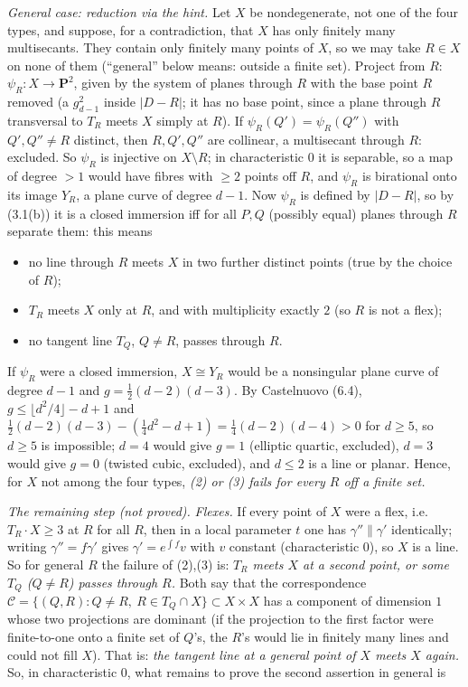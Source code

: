 \documentclass[11pt]{article}
\begin{document}
\emph{General case: reduction via the hint.} Let $X$ be nondegenerate, not one of the four types, and suppose, for a contradiction, that $X$ has only finitely many multisecants. They contain only finitely many points of $X$, so we may take $R\in X$ on none of them (``general'' below means: outside a finite set). Project from $R$: $\psi_R:X\to\mathbf P^2$, given by the system of planes through $R$ with the base point $R$ removed (a $g^2_{d-1}$ inside $|D-R|$; it has no base point, since a plane through $R$ transversal to $T_R$ meets $X$ simply at $R$). If $\psi_R(Q')=\psi_R(Q'')$ with $Q',Q''\ne R$ distinct, then $R,Q',Q''$ are collinear, a multisecant through $R$: excluded. So $\psi_R$ is injective on $X\setminus R$; in characteristic $0$ it is separable, so a map of degree $>1$ would have fibres with $\ge2$ points off $R$, and $\psi_R$ is birational onto its image $Y_R$, a plane curve of degree $d-1$. Now $\psi_R$ is defined by $|D-R|$, so by (3.1(b)) it is a closed immersion iff for all $P,Q$ (possibly equal) planes through $R$ separate them: this means

\begin{itemize}
\item[(1)] no line through $R$ meets $X$ in two further distinct points (true by the choice of $R$);
\item[(2)] $T_R$ meets $X$ only at $R$, and with multiplicity exactly $2$ (so $R$ is not a flex);
\item[(3)] no tangent line $T_Q$, $Q\ne R$, passes through $R$.
\end{itemize}

If $\psi_R$ were a closed immersion, $X\cong Y_R$ would be a nonsingular plane curve of degree $d-1$ and $g=\frac12(d-2)(d-3)$. By Castelnuovo (6.4), $g\le\lfloor d^2/4\rfloor-d+1$ and $\frac12(d-2)(d-3)-(\frac14d^2-d+1)=\frac14(d-2)(d-4)>0$ for $d\ge5$, so $d\ge5$ is impossible; $d=4$ would give $g=1$ (elliptic quartic, excluded), $d=3$ would give $g=0$ (twisted cubic, excluded), and $d\le2$ is a line or planar. Hence, for $X$ not among the four types, \emph{(2) or (3) fails for every $R$ off a finite set.}

\emph{The remaining step (not proved).} \emph{Flexes.} If every point of $X$ were a flex, i.e.\ $T_R\cdot X\ge3$ at $R$ for all $R$, then in a local parameter $t$ one has $\gamma''\parallel\gamma'$ identically; writing $\gamma''=f\gamma'$ gives $\gamma'=e^{\int f}v$ with $v$ constant (characteristic $0$), so $X$ is a line. So for general $R$ the failure of (2),(3) is: \emph{$T_R$ meets $X$ at a second point, or some $T_Q$ ($Q\ne R$) passes through $R$.} Both say that the correspondence $\mathcal C=\{(Q,R):Q\ne R,\ R\in T_Q\cap X\}\subset X\times X$ has a component of dimension $1$ whose two projections are dominant (if the projection to the first factor were finite-to-one onto a finite set of $Q$'s, the $R$'s would lie in finitely many lines and could not fill $X$). That is: \emph{the tangent line at a general point of $X$ meets $X$ again.} So, in characteristic $0$, what remains to prove the second assertion in general is
\end{document}
